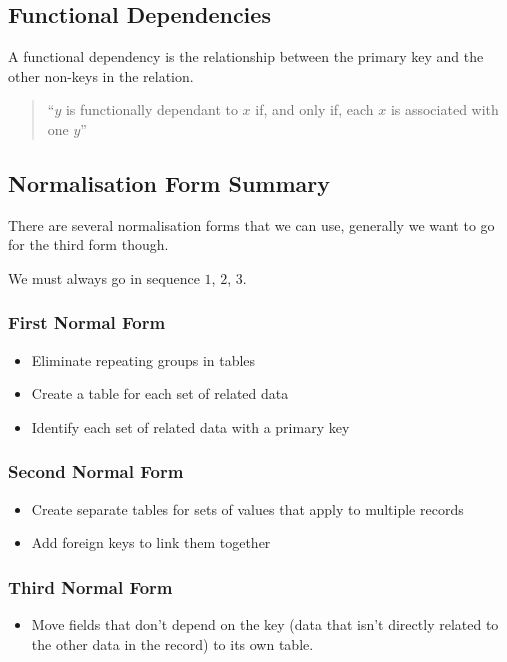 \subsection{Functional Dependencies}\label{sub:functional_dependancies}

A functional dependency is the relationship between the primary key and the other non-keys in the relation.
\begin{quote}
    ``\(y\) is functionally dependant to \(x\) if, and only if, each \(x\) is associated with one \(y\)'' 
\end{quote}

\subsection{Normalisation Form Summary}\label{sub:normalisation_form_summary}

There are several normalisation forms that we can use, generally we want to go for the third form though.

\begin{note}
    We must always go in sequence \(1\), \(2\), \(3\).
\end{note}

\subsubsection{First Normal Form}\label{ssub:first_normal_form}

\begin{itemize}
    \item Eliminate repeating groups in tables
    \item Create a table for each set of related data
    \item Identify each set of related data with a primary key
\end{itemize}

\subsubsection{Second Normal Form}\label{ssub:second_normal_form}

\begin{itemize}
    \item Create separate tables for sets of values that apply to multiple records
    \item Add foreign keys to link them together
\end{itemize}

\subsubsection{Third Normal Form}\label{ssub:third_normal_form}

\begin{itemize}
    \item Move fields that don't depend on the key (data that isn't directly related to the other data in the record) to its own table.
\end{itemize}

